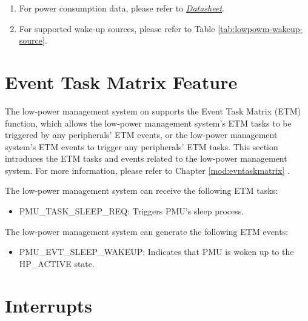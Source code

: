\documentclass[main\_\_EN.tex]{subfiles}
\begin{document}
\begin{tiplisting}
\vspace{-2em}
\label{other:lowpowm-predefined-modes-notes}
\begin{enumerate}
\item For power consumption data, please refer to \href{https://www.espressif.com/sites/default/files/documentation/esp32-p4_datasheet_en.pdf}{\it{\chipname{} Datasheet}}.
\item For supported wake-up sources, please refer to Table \ref{tab:lowpowm-wakeup-source}.
\end{enumerate}
\end{tiplisting}


\section{Event Task Matrix Feature}
\label{sec:lowpowm-etm-func}

The low-power management system on \chipname{} supports the Event Task Matrix (ETM) function, which allows the low-power management system's ETM tasks to be triggered by any peripherals' ETM events, or the low-power management system's ETM events to trigger any peripherals' ETM tasks. This section introduces the ETM tasks and events related to the low-power management system. For more information, please refer to Chapter \ref{mod:evntaskmatrix} .

The low-power management system can receive the following ETM tasks:

\begin{itemize}
\item PMU\_TASK\_SLEEP\_REQ: Triggers PMU's sleep process.
\end{itemize}

The low-power management system can generate the following ETM events:

\begin{itemize}
\item PMU\_EVT\_SLEEP\_WAKEUP: Indicates that PMU is woken up to the HP\_ACTIVE state.
\end{itemize}


\section{Interrupts}
\end{document}

